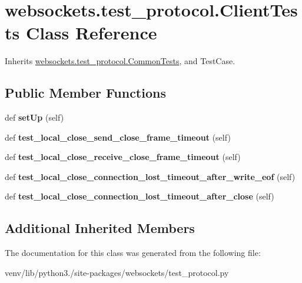 \hypertarget{classwebsockets_1_1test__protocol_1_1_client_tests}{}\section{websockets.\+test\+\_\+protocol.\+Client\+Tests Class Reference}
\label{classwebsockets_1_1test__protocol_1_1_client_tests}


Inherits \hyperlink{classwebsockets_1_1test__protocol_1_1_common_tests}{websockets.\+test\+\_\+protocol.\+Common\+Tests}, and Test\+Case.

\subsection*{Public Member Functions}
\begin{DoxyCompactItemize}
\item 
\mbox{\label{classwebsockets_1_1test__protocol_1_1_client_tests_aee9cbd82cda980a32bdfc55cdb8baf74}} 
def {\bfseries set\+Up} (self)
\item 
\mbox{\label{classwebsockets_1_1test__protocol_1_1_client_tests_af7f27d3e3b3007f4902b6d257d375af6}} 
def {\bfseries test\+\_\+local\+\_\+close\+\_\+send\+\_\+close\+\_\+frame\+\_\+timeout} (self)
\item 
\mbox{\label{classwebsockets_1_1test__protocol_1_1_client_tests_ae645991bd96f565276f53d60bc2b94bb}} 
def {\bfseries test\+\_\+local\+\_\+close\+\_\+receive\+\_\+close\+\_\+frame\+\_\+timeout} (self)
\item 
\mbox{\label{classwebsockets_1_1test__protocol_1_1_client_tests_a62f1bc4da61470460054b6d7f7e41ffa}} 
def {\bfseries test\+\_\+local\+\_\+close\+\_\+connection\+\_\+lost\+\_\+timeout\+\_\+after\+\_\+write\+\_\+eof} (self)
\item 
\mbox{\label{classwebsockets_1_1test__protocol_1_1_client_tests_af4bea2c49acc25bdbf975e5ad8291e14}} 
def {\bfseries test\+\_\+local\+\_\+close\+\_\+connection\+\_\+lost\+\_\+timeout\+\_\+after\+\_\+close} (self)
\end{DoxyCompactItemize}
\subsection*{Additional Inherited Members}


The documentation for this class was generated from the following file\+:\begin{DoxyCompactItemize}
\item 
venv/lib/python3./site-\/packages/websockets/test\+\_\+protocol.\+py\end{DoxyCompactItemize}
